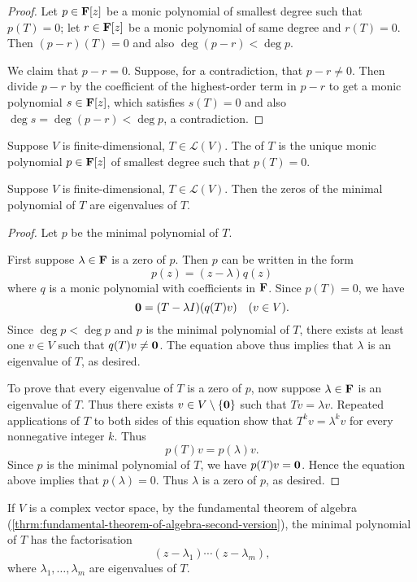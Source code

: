 \begin{proof}
 Let $p\in\mathbf F[z]$ be a monic polynomial of smallest degree such that $p(T)=0$; let $r\in\mathbf F[z]$ be a monic polynomial of same degree and $r(T)=0$. Then $(p-r)(T)=0$ and also $\deg(p-r)<\deg p$.

We claim that $p-r=0$. Suppose, for a contradiction, that $p-r\neq0$. Then divide $p-r$ by the coefficient of the highest-order term in $p-r$ to get a monic polynomial $s\in\mathbf F[z]$, which satisfies $s(T)=0$ and also $\deg s=\deg(p-r)<\deg p$, a contradiction.
\end{proof}

\begin{definition}
Suppose $V$ is finite-dimensional, $T\in\mathcal{L}(V)$. The  of $T$ is the unique monic polynomial $p\in\mathbf F[z]$ of smallest degree such that $p(T)=0$.
\end{definition}

\begin{theorem}\label{thrm:eigenvalues-minimal-polynomial-zeros}
Suppose $V$ is finite-dimensional, $T\in\mathcal{L}(V)$. Then the zeros of the minimal polynomial of $T$ are eigenvalues of $T$.
\end{theorem}

\begin{proof}
Let $p$ be the minimal polynomial of $T$.

\forward First suppose $\lambda\in\mathbf F$ is a zero of $p$. Then $p$ can be written in the form
\[p(z)=(z-\lambda)q(z)\]
where $q$ is a monic polynomial with coefficients in $\mathbf F$. Since $p(T)=0$, we have
\[\vb{0}=(T-\lambda I)(q(T)v)\quad(v\in V).\]
Since $\deg p<\deg p$ and $p$ is the minimal polynomial of $T$, there exists at least one $v\in V$ such that $q(T)v\neq\vb{0}$. The equation above thus implies that $\lambda$ is an eigenvalue of $T$, as desired.

\backward To prove that every eigenvalue of $T$ is a zero of $p$, now suppose $\lambda\in\mathbf F$ is an eigenvalue of $T$. Thus there exists $v\in V\setminus\{\vb{0}\}$ such that $Tv=\lambda v$. Repeated applications of $T$ to both sides of this equation show that $T^k v=\lambda^k v$ for every nonnegative integer $k$. Thus
\[p(T)v=p(\lambda)v.\]
Since $p$ is the minimal polynomial of $T$, we have $p(T)v=\vb{0}$. Hence the equation above implies that $p(\lambda)=0$. Thus $\lambda$ is a zero of $p$, as desired.
\end{proof}

If $V$ is a complex vector space, by the fundamental theorem of algebra (\ref{thrm:fundamental-theorem-of-algebra-second-version}), the minimal polynomial of $T$ has the factorisation
\begin{equation}
(z-\lambda_1)\cdots(z-\lambda_m),
\end{equation}
where $\lambda_1,\dots,\lambda_m$ are eigenvalues of $T$.

